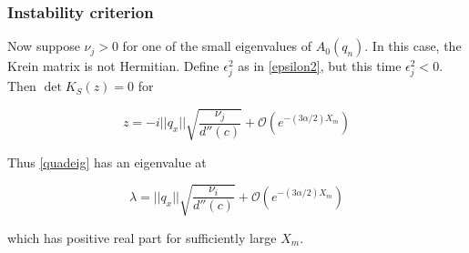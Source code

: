 \documentclass[12pt]{article}
\begin{document}
\subsubsection{Instability criterion}

Now suppose $\nu_j > 0$ for one of the small eigenvalues of $A_0(q_n)$. In this case, the Krein matrix is not Hermitian. Define $\epsilon_j^2$ as in \eqref{epsilon2}, but this time $\epsilon_j^2 < 0$. Then $\det K_S(z) = 0$ for 

\begin{equation}
z = -i ||q_x|| \sqrt{ \frac{ \nu_j}{d''(c)} } + \mathcal{O}(e^{-(3 \alpha/2) X_m})
\end{equation}

Thus \eqref{quadeig} has an eigenvalue at

\begin{equation}
\lambda = ||q_x|| \sqrt{ \frac{ \nu_i}{d''(c)} } + \mathcal{O}(e^{-(3 \alpha/2) X_m})
\end{equation}

which has positive real part for sufficiently large $X_m$. 



\end{document}
